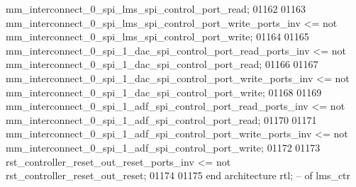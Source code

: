 \begin{DoxyCode}
{      mm_interconnect_0_spi_lms_spi_control_port_read};
01162 
01163     \textcolor{vhdlchar}{mm_interconnect_0_spi_lms_spi_control_port_write_ports_inv} \textcolor{vhdlchar}{<=} \textcolor{keywordflow}{not} \textcolor{vhdlchar}{
      mm_interconnect_0_spi_lms_spi_control_port_write};
01164 
01165     \textcolor{vhdlchar}{mm_interconnect_0_spi_1_dac_spi_control_port_read_ports_inv} \textcolor{vhdlchar}{<=} \textcolor{keywordflow}{not} \textcolor{vhdlchar}{
      mm_interconnect_0_spi_1_dac_spi_control_port_read};
01166 
01167     \textcolor{vhdlchar}{mm_interconnect_0_spi_1_dac_spi_control_port_write_ports_inv} \textcolor{vhdlchar}{<=} \textcolor{keywordflow}{not} \textcolor{vhdlchar}{
      mm_interconnect_0_spi_1_dac_spi_control_port_write};
01168 
01169     \textcolor{vhdlchar}{mm_interconnect_0_spi_1_adf_spi_control_port_read_ports_inv} \textcolor{vhdlchar}{<=} \textcolor{keywordflow}{not} \textcolor{vhdlchar}{
      mm_interconnect_0_spi_1_adf_spi_control_port_read};
01170 
01171     \textcolor{vhdlchar}{mm_interconnect_0_spi_1_adf_spi_control_port_write_ports_inv} \textcolor{vhdlchar}{<=} \textcolor{keywordflow}{not} \textcolor{vhdlchar}{
      mm_interconnect_0_spi_1_adf_spi_control_port_write};
01172 
01173     \textcolor{vhdlchar}{rst_controller_reset_out_reset_ports_inv} \textcolor{vhdlchar}{<=} \textcolor{keywordflow}{not} \textcolor{vhdlchar}{
      rst_controller_reset_out_reset};
01174 
01175 \textcolor{keywordflow}{end} \textcolor{keywordflow}{architecture} \textcolor{vhdlchar}{rtl};\textcolor{keyword}{ -- of lms\_ctr}
\end{DoxyCode}
